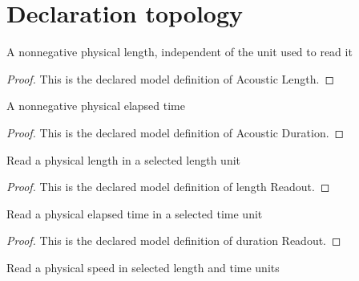 \section{Declaration topology}
\begin{definition}
  \label{def:physics:phyx-mini-0198:phyxminiproblems-problemphyxmini0198-acousticlength}
  A nonnegative physical length, independent of the unit used to read it
\end{definition}
\begin{proof}
  This is the declared model definition of Acoustic Length.
\end{proof}
\begin{definition}
  \label{def:physics:phyx-mini-0198:phyxminiproblems-problemphyxmini0198-acousticduration}
  A nonnegative physical elapsed time
\end{definition}
\begin{proof}
  This is the declared model definition of Acoustic Duration.
\end{proof}
\begin{definition}
  \label{def:physics:phyx-mini-0198:phyxminiproblems-problemphyxmini0198-lengthreadout}
  Read a physical length in a selected length unit
\end{definition}
\begin{proof}
  This is the declared model definition of length Readout.
\end{proof}
\begin{definition}
  \label{def:physics:phyx-mini-0198:phyxminiproblems-problemphyxmini0198-durationreadout}
  Read a physical elapsed time in a selected time unit
\end{definition}
\begin{proof}
  This is the declared model definition of duration Readout.
\end{proof}
\begin{definition}
  \label{def:physics:phyx-mini-0198:phyxminiproblems-problemphyxmini0198-speedreadout}
  Read a physical speed in selected length and time units
\end{definition}
